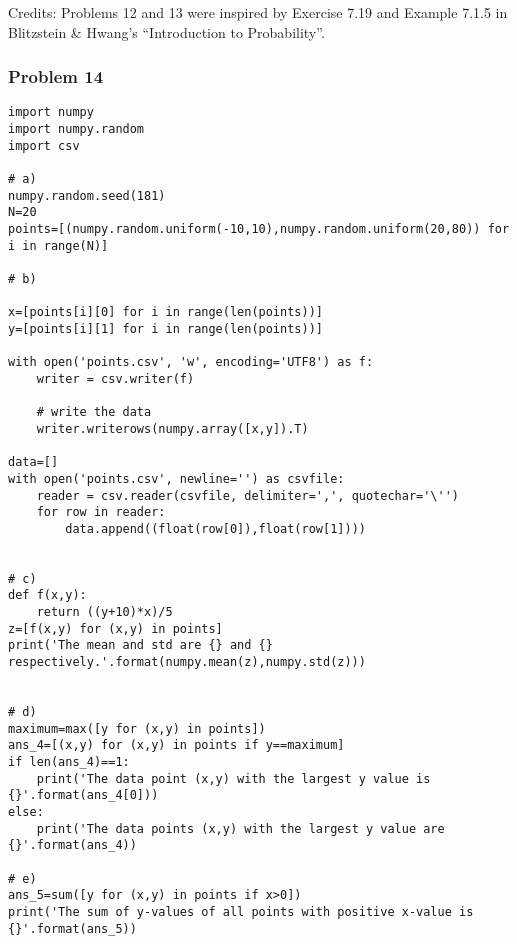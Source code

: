\documentclass{harvardml}
\theoremstyle{definition}
\theoremstyle{plain}
\begin{document}
\noindent Credits:  Problems 12 and 13 were inspired by Exercise 7.19 and  Example 7.1.5 in Blitzstein \& Hwang's ``Introduction to Probability''.

\subsubsection*{Problem 14}
\begin{verbatim}
import numpy 
import numpy.random 
import csv

# a)
numpy.random.seed(181)
N=20
points=[(numpy.random.uniform(-10,10),numpy.random.uniform(20,80)) for i in range(N)]

# b)

x=[points[i][0] for i in range(len(points))]
y=[points[i][1] for i in range(len(points))]

with open('points.csv', 'w', encoding='UTF8') as f:
    writer = csv.writer(f)

    # write the data
    writer.writerows(numpy.array([x,y]).T)

data=[]
with open('points.csv', newline='') as csvfile:
    reader = csv.reader(csvfile, delimiter=',', quotechar='\'')
    for row in reader:
        data.append((float(row[0]),float(row[1])))


# c)
def f(x,y):
    return ((y+10)*x)/5
z=[f(x,y) for (x,y) in points]
print('The mean and std are {} and {} respectively.'.format(numpy.mean(z),numpy.std(z)))


# d)
maximum=max([y for (x,y) in points])
ans_4=[(x,y) for (x,y) in points if y==maximum]
if len(ans_4)==1:
    print('The data point (x,y) with the largest y value is {}'.format(ans_4[0]))
else:
    print('The data points (x,y) with the largest y value are {}'.format(ans_4))
    
# e)
ans_5=sum([y for (x,y) in points if x>0])
print('The sum of y-values of all points with positive x-value is {}'.format(ans_5))
\end{verbatim}
\end{document}
